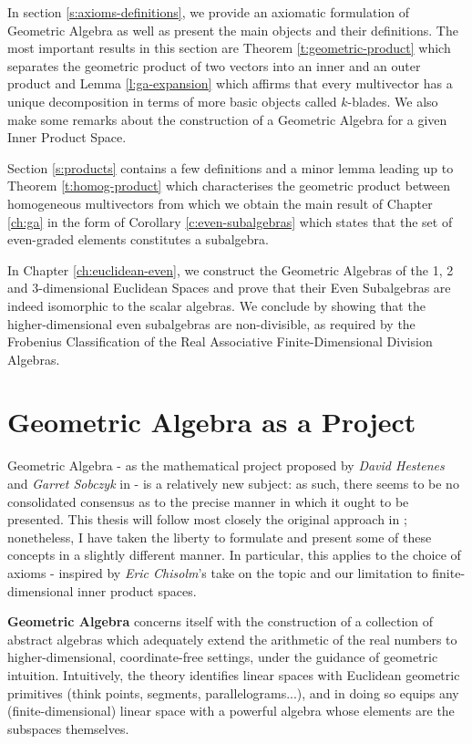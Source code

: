 In section \ref{s:axioms-definitions}, we provide an axiomatic formulation of Geometric Algebra as well as present the main objects and their definitions. The most important results in this section are Theorem \ref{t:geometric-product} which separates the geometric product of two vectors into an inner and an outer product and Lemma \ref{l:ga-expansion} which affirms that every multivector has a unique decomposition in terms of more basic objects called $k$-blades. We also make some remarks about the construction of a Geometric Algebra for a given Inner Product Space.

Section \ref{s:products} contains a few definitions and a minor lemma leading up to Theorem \ref{t:homog-product} which characterises the geometric product between homogeneous multivectors from which we obtain the main result of Chapter \ref{ch:ga} in the form of Corollary \ref{c:even-subalgebras} which states that the set of even-graded elements constitutes a subalgebra.

In Chapter \ref{ch:euclidean-even}, we construct the Geometric Algebras of the 1, 2 and 3-dimensional Euclidean Spaces and prove that their Even Subalgebras are indeed isomorphic to the scalar algebras. We conclude by showing that the higher-dimensional even subalgebras are non-divisible, as required by the Frobenius Classification of the Real Associative Finite-Dimensional Division Algebras.


\section{Geometric Algebra as a Project}
Geometric Algebra - as the mathematical project proposed by \textit{David Hestenes} and \textit{Garret Sobczyk} in \cite{ga-origin} - is a relatively new subject: as such, there seems to be no consolidated consensus as to the precise manner in which it ought to be presented. This thesis will follow most closely the original approach in \cite{ga-origin}; nonetheless, I have taken the liberty to formulate and present some of these concepts in a slightly different manner. In particular, this applies to the choice of axioms - inspired by \textit{Eric Chisolm}'s take on the topic \cite{ga-chisolm} and our limitation to finite-dimensional inner product spaces.

\textbf{Geometric Algebra} concerns itself with the construction of a collection of abstract algebras which adequately extend the arithmetic of the real numbers to higher-dimensional, coordinate-free settings, under the guidance of geometric intuition. Intuitively, the theory identifies linear spaces with Euclidean geometric primitives (think points, segments, parallelograms...), and in doing so equips any (finite-dimensional) linear space with a powerful algebra whose elements are the subspaces themselves.

